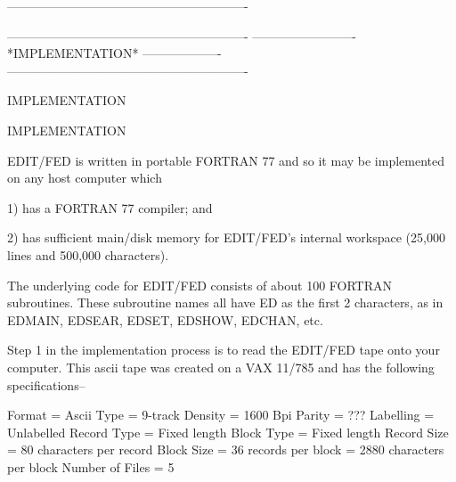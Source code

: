  
----------------------------------------------------------
 
 
 
 
 
 
 
 
 
 
 
 
 
 
 
 
 
 
 
 
 
 
 
 
 
 
 
 
 
 
 
 
 
 
 
 
 
 
 
 
 
 
 
 
 
 
 
 
 
 
 
----------------------------------------------------------
-------------------------  *IMPLEMENTATION*  -------------------
----------------------------------------------------------
 
IMPLEMENTATION
 
IMPLEMENTATION
 
   EDIT/FED is written in portable FORTRAN 77
   and so it may be implemented on any
   host computer which
 
      1) has a FORTRAN 77 compiler; and
 
      2) has sufficient main/disk
         memory for EDIT/FED's internal
         workspace (25,000 lines and
         500,000 characters).
 
   The underlying code for EDIT/FED consists of
   about 100 FORTRAN subroutines.  These
   subroutine names all have    ED   as the
   first 2 characters, as in EDMAIN, EDSEAR,
   EDSET, EDSHOW, EDCHAN, etc.
 
   Step 1 in the implementation process is
   to read the EDIT/FED tape onto your computer.
   This ascii tape was created on a
   VAX 11/785 and has the following
   specifications--
 
      Format          = Ascii
      Type            = 9-track
      Density         = 1600 Bpi
      Parity          = ???
      Labelling       = Unlabelled
      Record Type     = Fixed length
      Block Type      = Fixed length
      Record Size     = 80   characters per record
      Block  Size     = 36   records    per block
                      = 2880 characters per block
      Number of Files = 5
 
